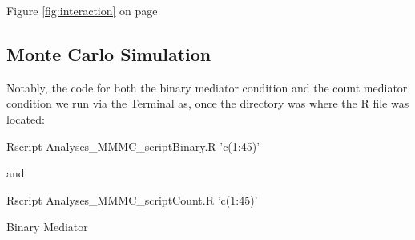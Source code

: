 \documentclass[]{DissertateCUNY}
\newenvironment{Shaded}{\begin{snugshade}}{\end{snugshade}}
\newcommand{\ExtensionTok}[1]{#1}
\newcommand{\NormalTok}[1]{#1}
\newcommand{\StringTok}[1]{\textcolor[rgb]{0.31,0.60,0.02}{#1}}
\begin{document}
Figure \ref{fig:interaction} on page \pageref{fig:interaction}

\small

\normalsize

\clearpage

\hypertarget{monte-carlo-simulation}{%
\subsection*{Monte Carlo Simulation}\label{monte-carlo-simulation}}

Notably, the code for both the binary mediator condition and the count
mediator condition we run via the Terminal as, once the directory was
where the R file was located:

\small

\begin{Shaded}
\begin{Highlighting}[]
\ExtensionTok{Rscript}\NormalTok{ Analyses_MMMC_scriptBinary.R }\StringTok{'c(1:45)'}
\end{Highlighting}
\end{Shaded}

\normalsize

\noindent and

\small

\begin{Shaded}
\begin{Highlighting}[]
\ExtensionTok{Rscript}\NormalTok{ Analyses_MMMC_scriptCount.R }\StringTok{'c(1:45)'}
\end{Highlighting}
\end{Shaded}

\normalsize

Binary Mediator

\small
\end{document}
